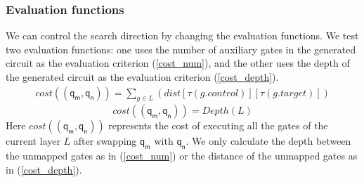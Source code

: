 \documentclass[journal]{IEEEtran}
\begin{document}
\subsubsection{Evaluation functions}
We can control the search direction by changing the evaluation functions.
We test two evaluation functions: one uses the number of auxiliary gates in the generated circuit as the evaluation criterion (\ref{cost_num}),  and the other uses the depth of the generated circuit as the evaluation criterion  (\ref{cost_depth}).
\begin{equation}
	 	\begin{aligned}
	cost((\textsf{q}_\textsf{m},\textsf{q}_\textsf{n}))=\sum_{g \in L}(dist[\tau(g.control)][\tau(g.target)])
    \label{cost_num}
         \end{aligned}
\end{equation}
	\begin{equation}
		cost((\textsf{q}_\textsf{m},\textsf{q}_\textsf{n}))= Depth(L)
		\label{cost_depth}
		\end{equation}
Here $cost((\textsf{q}_\textsf{m},\textsf{q}_\textsf{n}))$ represents the cost of executing all the gates of the current layer $L$ 
after swapping $\textsf{q}_\textsf{m}$ with $\textsf{q}_\textsf{n}$. We only calculate the depth between the unmapped gates as in (\ref{cost_num}) or the distance of the unmapped gates as in (\ref{cost_depth}).
\end{document}
